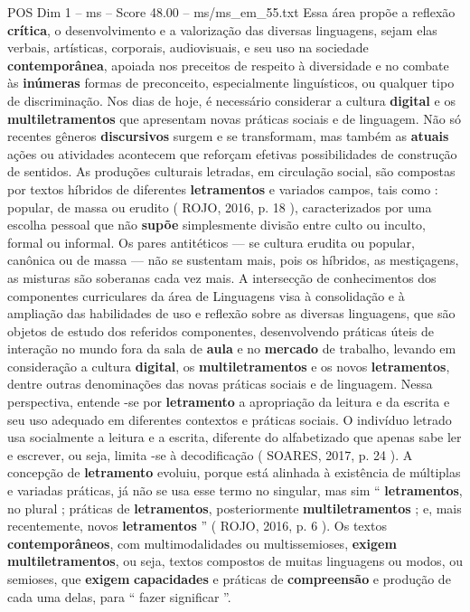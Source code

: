 \begin{textsample}{POS Dim 1 – ms – Score 48.00 – ms/ms\_em\_55.txt}
Essa área propõe a reflexão \textbf{crítica}, o desenvolvimento e a valorização das diversas linguagens, sejam elas verbais, artísticas, corporais, audiovisuais, e seu uso na sociedade \textbf{contemporânea}, apoiada nos preceitos de respeito à diversidade e no combate às \textbf{inúmeras} formas de preconceito, especialmente linguísticos, ou qualquer tipo de discriminação.
Nos dias de hoje, é necessário considerar a cultura \textbf{digital} e os \textbf{multiletramentos} que apresentam novas práticas sociais e de linguagem.
Não só recentes gêneros \textbf{discursivos} surgem e se transformam, mas também as \textbf{atuais} ações ou atividades acontecem que reforçam efetivas possibilidades de construção de sentidos.
As produções culturais letradas, em circulação social, são compostas por textos híbridos de diferentes \textbf{letramentos} e variados campos, tais como : popular, de massa ou erudito ( ROJO, 2016, p. 18 ), caracterizados por uma escolha pessoal que não \textbf{supõe} simplesmente divisão entre culto ou inculto, formal ou informal.
Os pares antitéticos — se cultura erudita ou popular, canônica ou de massa — não se sustentam mais, pois os híbridos, as mestiçagens, as misturas são soberanas cada vez mais.
A intersecção de conhecimentos dos componentes curriculares da área de Linguagens visa à consolidação e à ampliação das habilidades de uso e reflexão sobre as diversas linguagens, que são objetos de estudo dos referidos componentes, desenvolvendo práticas úteis de interação no mundo fora da sala de \textbf{aula} e no \textbf{mercado} de trabalho, levando em consideração a cultura \textbf{digital}, os \textbf{multiletramentos} e os novos \textbf{letramentos}, dentre outras denominações das novas práticas sociais e de linguagem.
Nessa perspectiva, entende -se por \textbf{letramento} a apropriação da leitura e da escrita e seu uso adequado em diferentes contextos e práticas sociais.
O indivíduo letrado usa socialmente a leitura e a escrita, diferente do alfabetizado que apenas sabe ler e escrever, ou seja, limita -se à decodificação ( SOARES, 2017, p. 24 ).
A concepção de \textbf{letramento} evoluiu, porque está alinhada à existência de múltiplas e variadas práticas, já não se usa esse termo no singular, mas sim “ \textbf{letramentos}, no plural ; práticas de \textbf{letramentos}, posteriormente \textbf{multiletramentos} ; e, mais recentemente, novos \textbf{letramentos} ” ( ROJO, 2016, p. 6 ).
Os textos \textbf{contemporâneos}, com multimodalidades ou multissemioses, \textbf{exigem} \textbf{multiletramentos}, ou seja, textos compostos de muitas linguagens ou modos, ou semioses, que \textbf{exigem} \textbf{capacidades} e práticas de \textbf{compreensão} e produção de cada uma delas, para “ fazer significar ”.

\end{textsample}
